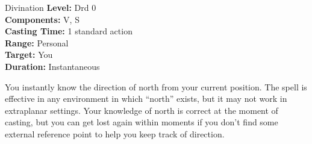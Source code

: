 {Divination}
{
	\textbf{Level:}
	Drd 0\\
	\textbf{Components:}
	V, S\\
	\textbf{Casting Time:}
	1 standard action\\
	\textbf{Range:}
	Personal\\
	\textbf{Target:}
	You\\
	\textbf{Duration:}
	Instantaneous\\
}
{
	You instantly know the direction of north from your current position. The spell is effective in any environment in which ``north'' exists, but it may not work in extraplanar settings. Your knowledge of north is correct at the moment of casting, but you can get lost again within moments if you don't find some external reference point to help you keep track of direction.

}

